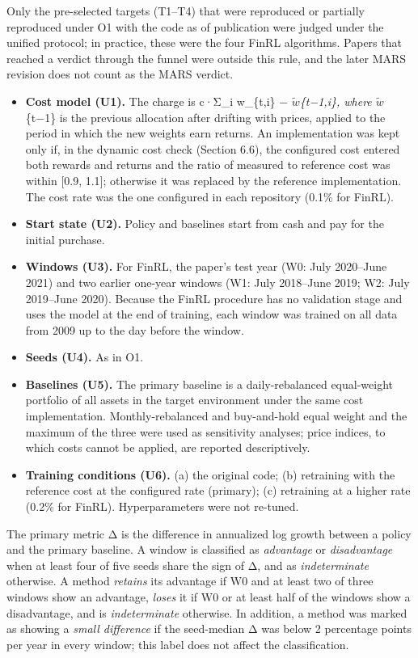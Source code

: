 \documentclass[12pt,a4paper]{report}
\providecommand{\tightlist}{\setlength{\itemsep}{0pt}\setlength{\parskip}{0pt}}
\begin{document}
Only the pre-selected targets (T1--T4) that were reproduced or partially
reproduced under O1 with the code as of publication were judged under
the unified protocol; in practice, these were the four FinRL algorithms.
Papers that reached a verdict through the funnel were outside this rule,
and the later MARS revision does not count as the MARS verdict.

\begin{itemize}
\tightlist
\item
  \textbf{Cost model (U1).} The charge is c·Σ\_i \textbar w\_\{t,i\} −
  \ensuremath{\tilde{w}}\emph{\{t−1,i\}\textbar, where \ensuremath{\tilde{w}}}\{t−1\} is the previous allocation
  after drifting with prices, applied to the period in which the new
  weights earn returns. An implementation was kept only if, in the
  dynamic cost check (Section 6.6), the configured cost entered both
  rewards and returns and the ratio of measured to reference cost was
  within {[}0.9, 1.1{]}; otherwise it was replaced by the reference
  implementation. The cost rate was the one configured in each
  repository (0.1\% for FinRL).
\item
  \textbf{Start state (U2).} Policy and baselines start from cash and
  pay for the initial purchase.
\item
  \textbf{Windows (U3).} For FinRL, the paper's test year (W0: July
  2020--June 2021) and two earlier one-year windows (W1: July 2018--June
  2019; W2: July 2019--June 2020). Because the FinRL procedure has no
  validation stage and uses the model at the end of training, each
  window was trained on all data from 2009 up to the day before the
  window.
\item
  \textbf{Seeds (U4).} As in O1.
\item
  \textbf{Baselines (U5).} The primary baseline is a daily-rebalanced
  equal-weight portfolio of all assets in the target environment under
  the same cost implementation. Monthly-rebalanced and buy-and-hold
  equal weight and the maximum of the three were used as sensitivity
  analyses; price indices, to which costs cannot be applied, are
  reported descriptively.
\item
  \textbf{Training conditions (U6).} (a) the original code; (b)
  retraining with the reference cost at the configured rate (primary);
  (c) retraining at a higher rate (0.2\% for FinRL). Hyperparameters
  were not re-tuned.
\end{itemize}

The primary metric Δ is the difference in annualized log growth between
a policy and the primary baseline. A window is classified as
\emph{advantage} or \emph{disadvantage} when at least four of five seeds
share the sign of Δ, and as \emph{indeterminate} otherwise. A method
\emph{retains} its advantage if W0 and at least two of three windows
show an advantage, \emph{loses} it if W0 or at least half of the windows
show a disadvantage, and is \emph{indeterminate} otherwise. In addition,
a method was marked as showing a \emph{small difference} if the
seed-median \textbar Δ\textbar{} was below 2 percentage points per year
in every window; this label does not affect the classification.
\end{document}
